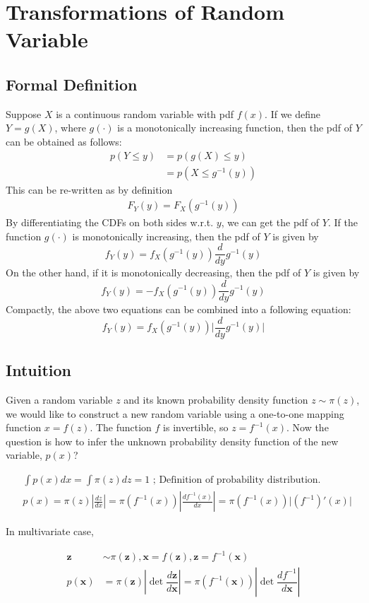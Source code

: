 \section{Transformations of Random Variable}
\subsection{Formal Definition}
Suppose $X$ is a continuous random variable with pdf $f(x)$. If we define $Y=g(X)$, where $g(\cdot)$ is a monotonically increasing function, then the pdf of $Y$ can be obtained as follows:
\begin{align*}
	p(Y\leq y) &= p(g(X)\leq y)\\
	& = p(X\leq g^{-1}(y))
\end{align*}
This can be re-written as by definition
\begin{align*}
F_Y(y) = F_X(g^{-1}(y))
\end{align*}
By differentiating the CDFs on both sides w.r.t. $y$, we can get the pdf of $Y$. If the function $g(\cdot)$ is monotonically increasing, then the pdf of $Y$ is given by
$$f_Y(y) = f_X(g^{-1}(y))\frac{d}{dy}g^{-1}(y)$$
On the other hand, if it is monotonically decreasing, then the pdf of $Y$ is given by
$$f_Y(y) = - f_X(g^{-1}(y))\frac{d}{dy}g^{-1}(y)$$
Compactly, the above two equations can be combined into a following equation:
$$f_Y(y) = f_X(g^{-1}(y))\Bigg|\frac{d}{dy}g^{-1}(y)\Bigg|$$

\subsection{Intuition}
Given a random variable $z$ and its known probability density function $z\sim \pi(z)$, we would like to construct a new random variable using a one-to-one mapping function $x=f(z)$. The function $f$ is invertible, so $z = f^{-1}(x)$. Now the question is how to infer the unknown probability density function of the new variable, $p(x)$?

$$
\begin{aligned}
& \int p(x)dx = \int \pi(z)dz = 1 \scriptstyle{\text{   ; Definition of probability distribution.}}\\
& p(x) = \pi(z) \left\vert\frac{dz}{dx}\right\vert = \pi(f^{-1}(x)) \left\vert\frac{d f^{-1}(x)}{dx}\right\vert = \pi(f^{-1}(x)) \vert (f^{-1})'(x) \vert
\end{aligned}$$

In multivariate case, 

\begin{align}
\mathbf{z} &\sim \pi(\mathbf{z}), \mathbf{x} = f(\mathbf{z}), \mathbf{z} = f^{-1}(\mathbf{x}) \\
p(\mathbf{x}) 
&= \pi(\mathbf{z}) \left\vert \det \dfrac{d \mathbf{z}}{d \mathbf{x}} \right\vert  
= \pi(f^{-1}(\mathbf{x})) \left\vert \det \dfrac{d f^{-1}}{d \mathbf{x}} \right\vert
\end{align}

